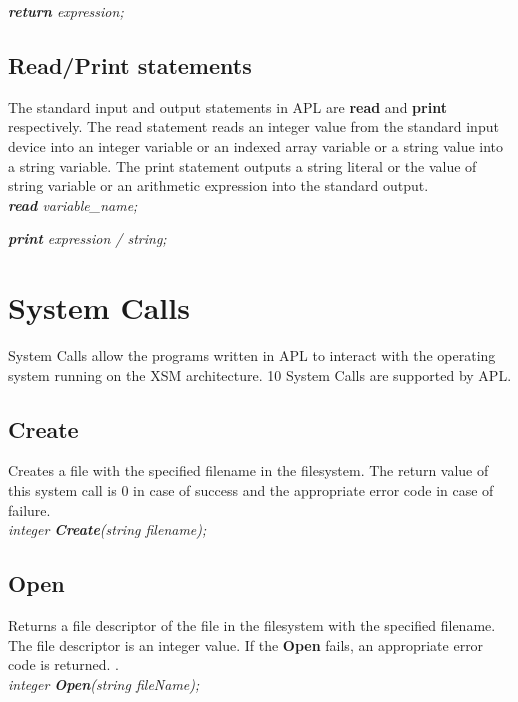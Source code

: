 \documentclass[11pt]{article}
\begin{document}
\textit{\textbf{return} expression;}


\subsection{Read/Print statements}
The standard input and output statements in APL are \textbf{read} and \textbf{print} respectively. The read statement reads an integer value from the standard input device into an integer variable or an indexed array variable or a string value into a string variable. The print statement outputs a string literal or the value of string variable or an arithmetic expression  into the standard output.\\

\textit{\textbf{read} variable\_name;}

\textit{\textbf{print} expression / string;}






\section{System Calls}

System Calls allow the programs written in APL to interact with the operating system running on the XSM architecture. 10 System Calls are supported by APL. 




\subsection{Create}
Creates a file with the specified filename in the filesystem. The return value of this system call is 0 in case of success and the appropriate error code in case of failure.
\\

\textit{integer \textbf{Create}(string filename);}






\subsection{Open}
Returns a file descriptor of the file in the filesystem with the specified filename. The file descriptor is an integer value. If the \textbf{Open} fails, an appropriate error code is returned.
.\\

\textit{integer \textbf{Open}(string fileName);}
\end{document}
